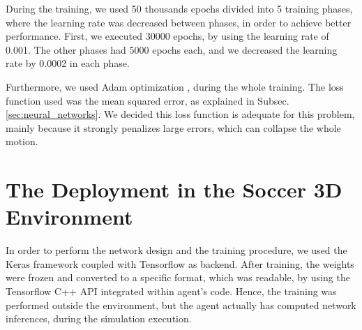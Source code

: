 During the training, we used 50 thousands epochs divided into 5 training phases, where the learning rate was decreased between phases, in order to achieve better performance. First, we executed 30000 epochs, by using the learning rate of 0.001. The other phases had 5000 epochs each, and we decreased the learning rate by 0.0002 in each phase.

Furthermore, we used Adam optimization \cite{adam2014}, during the whole training. The loss function used was the mean squared error, as explained in Subsec. \ref{sec:neural_networks}. We decided this loss function is adequate for this problem, mainly because it strongly penalizes large errors, which can collapse the whole motion.

\section{The Deployment in the Soccer 3D Environment}
In order to perform the network design and the training procedure, we used the Keras \cite{chollet2015keras} framework coupled with Tensorflow \cite{tensorflow2015-whitepaper} as backend. After training, the weights were frozen and converted to a specific format, which was readable, by using the Tensorflow C++ API integrated within agent's code. Hence, the training was performed outside the environment, but the agent actually has computed network inferences, during the simulation execution.
